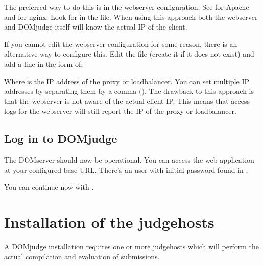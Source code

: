 \documentclass[a4paper,10pt,english,openany]{sphinxmanual}
\begin{document}
\sphinxAtStartPar
The preferred way to do this is in the webserver configuration. See
 for Apache and
 for nginx. Look for 
in the file. When using this approach both the webserver and DOMjudge itself
will know the actual IP of the client.

\sphinxAtStartPar
If you cannot edit the webserver configuration for some reason, there is an
alternative way to configure this. Edit the file  (create
it if it does not exist) and add a line in the form of:

\begin{sphinxVerbatim}[commandchars=\\\{\}]
\end{sphinxVerbatim}

\sphinxAtStartPar
Where  is the IP address of the proxy or loadbalancer. You can set
multiple IP addresses by separating them by a comma (\sphinxcode{\sphinxupquote{,}}). The drawback to
this approach is that the webserver is not aware of the actual client IP. This
means that access logs for the webserver will still report the IP of the proxy
or loadbalancer.


\subsection{Log in to DOMjudge}
\label{\detokenize{install-domserver:log-in-to-domjudge}}
\sphinxAtStartPar
The DOMserver should now be operational. You can access the web application
at your configured base URL. There’s an  user with initial password
found in .

\sphinxAtStartPar
You can continue now with
{\hyperref[\detokenize{install-judgehost::doc}]{}}.

\sphinxstepscope


\section{Installation of the judgehosts}
\label{\detokenize{install-judgehost:installation-of-the-judgehosts}}\label{\detokenize{install-judgehost::doc}}
\sphinxAtStartPar
A DOMjudge installation requires one or more judgehosts which will perform
the actual compilation and evaluation of submissions.
\end{document}
